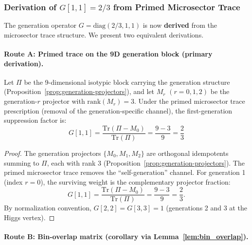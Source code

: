 \subsubsection{Derivation of $G[1,1] = 2/3$ from Primed Microsector Trace}\label{sec:G-derivation-theorem}

The generation operator $G = \mathrm{diag}(2/3, 1, 1)$ is now \textbf{derived} from the microsector 
trace structure. We present two equivalent derivations.

\paragraph{Route A: Primed trace on the 9D generation block (primary derivation).}

\begin{theorem}\label{thm:G-derived}
Let $\Pi$ be the 9-dimensional isotypic block carrying the generation structure 
(Proposition~\ref{prop:generation-projectors}), and let $M_r$ $(r = 0, 1, 2)$ be the generation-$r$ 
projector with $\mathrm{rank}(M_r) = 3$. Under the primed microsector trace prescription 
(removal of the generation-specific channel), the first-generation suppression factor is:
\begin{equation}
\boxed{G[1,1] = \frac{\mathrm{Tr}(\Pi - M_0)}{\mathrm{Tr}(\Pi)} = \frac{9 - 3}{9} = \frac{2}{3}}
\label{eq:G-primed-trace}
\end{equation}
\end{theorem}

\begin{proof}
The generation projectors $\{M_0, M_1, M_2\}$ are orthogonal idempotents summing to $\Pi$, 
each with rank 3 (Proposition~\ref{prop:generation-projectors}). The primed microsector trace 
removes the ``self-generation'' channel. For generation 1 (index $r = 0$), the surviving 
weight is the complementary projector fraction:
\begin{equation}
G[1,1] = \frac{\mathrm{Tr}(\Pi - M_0)}{\mathrm{Tr}(\Pi)} = \frac{9 - 3}{9} = \frac{2}{3}.
\end{equation}
By normalization convention, $G[2,2] = G[3,3] = 1$ (generations 2 and 3 at the Higgs vertex).
\end{proof}

\paragraph{Route B: Bin-overlap matrix (corollary via Lemma~\ref{lem:bin_overlap}).}

